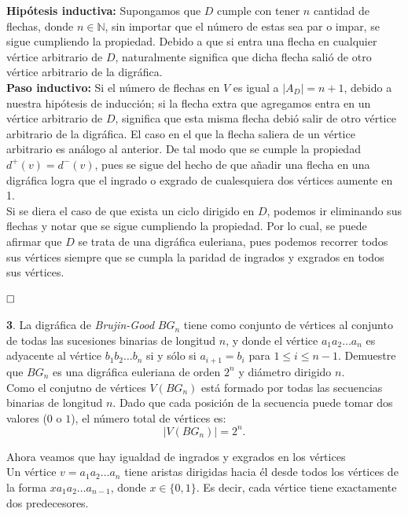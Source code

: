 \documentclass[12pt]{article}
\begin{document}
\textbf{Hipótesis inductiva:} Supongamos que $D$ cumple con tener $n$ cantidad de flechas, donde 
$n \in \mathbb{N}$, sin importar que el número de estas sea par o impar, se sigue cumpliendo la propiedad. 
Debido a que si entra una flecha en cualquier vértice arbitrario de $D$, naturalmente significa que dicha flecha 
salió de otro vértice arbitrario de la digráfica. \\

\textbf{Paso inductivo:} Si el número de flechas en $V$ es igual a $|A_D| = n + 1$, 
debido a nuestra hipótesis de inducción; si la flecha extra que agregamos entra en un vértice arbitrario 
de $D$, significa que esta misma flecha debió salir de otro vértice arbitrario de la digráfica. El caso en el que la 
flecha saliera de un vértice arbitrario es análogo al anterior. De tal modo que se cumple la propiedad $d^+(v) = d^-(v)$, 
pues se sigue del hecho de que añadir una flecha en una digráfica logra que el ingrado o exgrado de cualesquiera dos vértices 
aumente en 1.\\

Si se diera el caso de que exista un ciclo dirigido en $D$, podemos ir eliminando sus flechas y notar que se sigue cumpliendo 
la propiedad. Por lo cual, se puede afirmar que $D$ se trata de una digráfica euleriana, pues podemos recorrer 
todos sus vértices siempre que se cumpla la paridad de ingrados y exgrados en todos sus vértices.

$\hfill\square$

\vspace{1cm}
%
%
\textbf{3}. La digráfica de \textit{Brujin-Good} $BG_n$ tiene como conjunto de vértices al conjunto de todas 
las sucesiones binarias de longitud $n$, y donde el vértice $a_1 a_2 \dots a_n$ es adyacente al vértice 
$b_1 b_2 \dots b_n$ si y sólo si $a_{i+1} = b_i$ para $1 \leq i \leq n -1$. Demuestre que $BG_n$ es una digráfica
euleriana de orden $2^n$ y diámetro dirigido $n$.\\

Como el conjutno de vértices $V(BG_n)$ está formado por todas las secuencias binarias de longitud $n$. 
Dado que cada posición de la secuencia puede tomar dos valores ($0$ o $1$), el número total de vértices es:
\[|V(BG_n)| = 2^n.\]

Ahora veamos que hay igualdad de ingrados y exgrados en los vértices\\

Un vértice $ v = a_1a_2 \dots a_n $ tiene aristas dirigidas hacia él desde todos los vértices
 de la forma $ x a_1a_2 \dots a_{n-1} $, donde $ x \in \{0,1\} $. Es decir, cada vértice tiene 
 exactamente dos predecesores.\\
\end{document}
